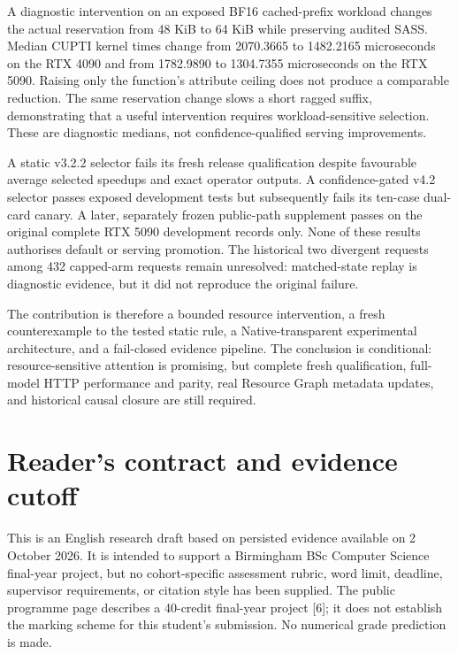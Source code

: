 \documentclass[11pt,a4paper]{article}
\begin{document}
A diagnostic intervention on an exposed BF16 cached-prefix workload changes the actual reservation from 48 KiB to 64 KiB while preserving audited SASS. Median CUPTI kernel times change from 2070.3665 to 1482.2165 microseconds on the RTX 4090 and from 1782.9890 to 1304.7355 microseconds on the RTX 5090. Raising only the function's attribute ceiling does not produce a comparable reduction. The same reservation change slows a short ragged suffix, demonstrating that a useful intervention requires workload-sensitive selection. These are diagnostic medians, not confidence-qualified serving improvements.


A static v3.2.2 selector fails its fresh release qualification despite favourable average selected speedups and exact operator outputs. A confidence-gated v4.2 selector passes exposed development tests but subsequently fails its ten-case dual-card canary. A later, separately frozen public-path supplement passes on the original complete RTX 5090 development records only. None of these results authorises default or serving promotion. The historical two divergent requests among 432 capped-arm requests remain unresolved: matched-state replay is diagnostic evidence, but it did not reproduce the original failure.


The contribution is therefore a bounded resource intervention, a fresh counterexample to the tested static rule, a Native-transparent experimental architecture, and a fail-closed evidence pipeline. The conclusion is conditional: resource-sensitive attention is promising, but complete fresh qualification, full-model HTTP performance and parity, real Resource Graph metadata updates, and historical causal closure are still required.


\clearpage

\section*{Reader's contract and evidence cutoff}


This is an English research draft based on persisted evidence available on 2 October 2026. It is intended to support a Birmingham BSc Computer Science final-year project, but no cohort-specific assessment rubric, word limit, deadline, supervisor requirements, or citation style has been supplied. The public programme page describes a 40-credit final-year project [6]; it does not establish the marking scheme for this student's submission. No numerical grade prediction is made.
\end{document}
